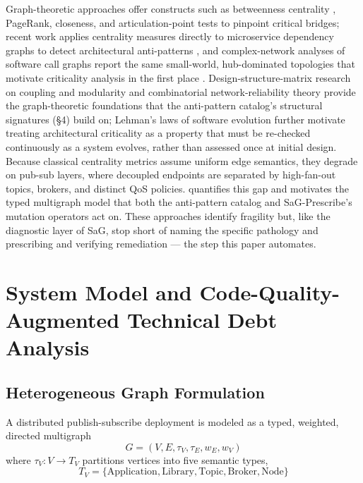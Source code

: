\documentclass[11pt]{article}
\begin{document}
Graph-theoretic approaches offer constructs such as betweenness centrality \cite{Freeman1977},
PageRank, closeness, and articulation-point tests to pinpoint critical bridges; recent work applies
centrality measures directly to microservice dependency graphs to detect architectural anti-patterns
\cite{Bakhtin2025}, and complex-network analyses of software call graphs report the same small-world,
hub-dominated topologies that motivate criticality analysis in the first place \cite{Falci2017}.
Design-structure-matrix research on coupling and modularity \cite{Baldwin2000} and combinatorial
network-reliability theory \cite{Colbourn1987} provide the graph-theoretic foundations that the
anti-pattern catalog's structural signatures (\S4) build on; Lehman's laws of software evolution
\cite{Lehman1996} further motivate treating architectural criticality as a property that must be
re-checked continuously as a system evolves, rather than assessed once at initial design. Because
classical centrality metrics assume uniform edge semantics, they degrade on pub-sub layers, where
decoupled endpoints are separated by high-fan-out topics, brokers, and distinct QoS policies.
\cite{SaG} quantifies this gap and motivates the typed multigraph model that both the anti-pattern
catalog and SaG-Prescribe's mutation operators act on. These approaches identify fragility but, like
the diagnostic layer of SaG, stop short of naming the specific pathology and prescribing and verifying
remediation --- the step this paper automates.

\section{System Model and Code-Quality-Augmented Technical Debt Analysis}

\subsection{Heterogeneous Graph Formulation}

A distributed publish-subscribe deployment is modeled as a typed, weighted, directed multigraph
\begin{equation*}
G = (V, E, \tau_V, \tau_E, w_E, w_V)
\end{equation*}
where $\tau_V : V \to T_V$ partitions vertices into five semantic types,
\begin{equation*}
T_V = \{\text{Application}, \text{Library}, \text{Topic}, \text{Broker}, \text{Node}\}
\end{equation*}
\end{document}
